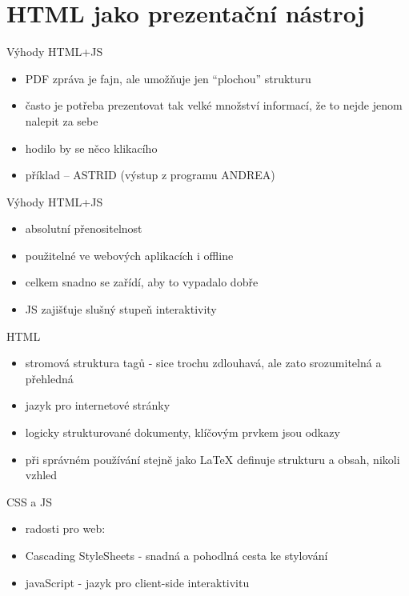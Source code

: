 \documentclass{beamer}
\begin{document}
\section{HTML jako prezentační nástroj}

\begin{frame}{Výhody HTML+JS}
  \begin{itemize}
    \item PDF zpráva je fajn, ale umožňuje jen ``plochou'' strukturu
    \item často je potřeba prezentovat tak velké množství informací, že to nejde jenom nalepit za sebe
    \item hodilo by se něco klikacího
    \item příklad -- ASTRID (výstup z programu ANDREA)
  \end{itemize}
\end{frame}

\begin{frame}{Výhody HTML+JS}
  \begin{itemize}
    \item absolutní přenositelnost
    \item použitelné ve webových aplikacích i offline
    \item celkem snadno se zařídí, aby to vypadalo dobře
    \item JS zajišťuje slušný stupeň interaktivity
  \end{itemize}
\end{frame}

\begin{frame}{HTML}
  \begin{itemize}
    \item stromová struktura tagů - sice trochu zdlouhavá, ale zato srozumitelná a přehledná
    \item jazyk pro internetové stránky
    \item logicky strukturované dokumenty, klíčovým prvkem jsou odkazy
    \item při správném používání stejně jako LaTeX definuje strukturu a obsah, nikoli vzhled
  \end{itemize}
\end{frame}

\begin{frame}{CSS a JS}
  \begin{itemize}
    \item radosti pro web:
    \item Cascading StyleSheets - snadná a pohodlná cesta ke stylování
    \item javaScript - jazyk pro client-side interaktivitu
  \end{itemize}
\end{frame}
\end{document}

